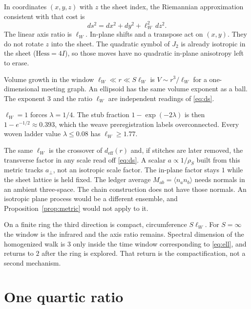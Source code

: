 \begin{proposition}
\label{prop:metric}
In coordinates \((x,y,z)\) with \(z\) the sheet index, the Riemannian
approximation consistent with that cost is
\begin{equation}
\label{eq:ds}
ds^2=dx^2+dy^2+\ell_W^2\,dz^2.
\end{equation}
The linear axis ratio is \(\ell_W\).
In-plane shifts and a transpose act on \((x,y)\).
They do not rotate \(z\) into the sheet.
The quadratic symbol of \(J_2\) is already isotropic in the sheet
(\(\mathrm{Hess}=4I\)), so those moves have no quadratic in-plane
anisotropy left to erase.
\end{proposition}

Volume growth in the window \(\ell_W\ll r\ll S\ell_W\) is
\(V\sim r^3/\ell_W\) for a one-dimensional meeting graph.
An ellipsoid has the same volume exponent as a ball.
The exponent \(3\) and the ratio \(\ell_W\) are independent readings of
\eqref{eq:ds}.

\begin{proposition}
\label{prop:over}
\(\ell_W=1\) forces \(\lambda=1/4\).
The stub fraction \(1-\exp(-2\lambda)\) is then \(1-e^{-1/2}\approx 0.393\),
which the weave preregistration labels overconnected.
Every woven ladder value \(\lambda\le 0.08\) has \(\ell_W\ge 1.77\).
\end{proposition}

The same \(\ell_W\) is the crossover of \(d_{\mathrm{eff}}(r)\) and,
if stitches are later removed, the transverse factor in any scale
read off \eqref{eq:ds}.
A scalar \(a\propto 1/\rho_S\) built from this metric tracks \(a_\perp\),
not an isotropic scale factor.
The in-plane factor stays \(1\) while the sheet lattice is held fixed.
The ledger average \(M_{ab}=\langle n_a n_b\rangle\) needs normals in an
ambient three-space.
The chain construction does not have those normals.
An isotropic plane process would be a different ensemble, and
Proposition~\ref{prop:metric} would not apply to it.

On a finite ring the third direction is compact, circumference \(S\ell_W\).
For \(S=\infty\) the window is the infrared and the axis ratio remains.
Spectral dimension of the homogenized walk is \(3\) only inside the time
window corresponding to \eqref{eq:ell}, and returns to \(2\) after the ring
is explored.
That return is the compactification, not a second mechanism.

\section{One quartic ratio}
\label{sec:quartic}

